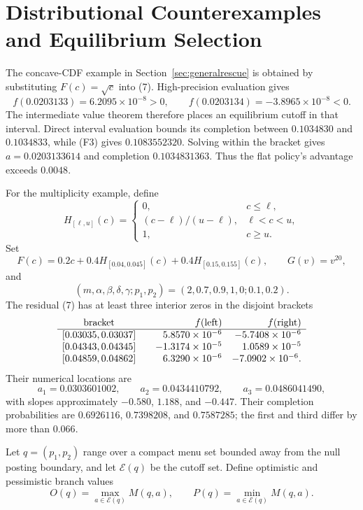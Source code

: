 \documentclass[mnsc,blindrev]{informs3}
\newcommand{\calE}{\mathcal E}
\begin{document}
\section{Distributional Counterexamples and Equilibrium Selection}
\label{app:general}

The concave-CDF example in Section~\ref{sec:generalrescue} is obtained by
substituting \(F(c)=\sqrt c\) into (7).  High-precision evaluation gives
\[
 f(0.0203133)=6.2095\times10^{-8}>0,\qquad
 f(0.0203134)=-3.8965\times10^{-8}<0.
\]
The intermediate value theorem therefore places an equilibrium cutoff in
that interval.  Direct interval evaluation bounds its completion between
\(0.1034830\) and \(0.1034833\), while (F3) gives \(0.1083552320\).  Solving
within the bracket gives \(a=0.0203133614\) and completion
\(0.1034831363\).  Thus the flat policy's advantage exceeds \(0.0048\).

For the multiplicity example, define
\[
 H_{[\ell,u]}(c)=
 \begin{cases}
 0,&c\le\ell,\\
 (c-\ell)/(u-\ell),&\ell<c<u,\\
 1,&c\ge u.
 \end{cases}
\]
Set
\[
 F(c)=0.2c+0.4H_{[0.04,0.045]}(c)
      +0.4H_{[0.15,0.155]}(c),\qquad G(v)=v^{20},
\]
and
\[
 (m,\alpha,\beta,\delta,\gamma;p_1,p_2)
 =(2,0.7,0.9,1,0;0.1,0.2).
\]
The residual (7) has at least three interior zeros in the disjoint brackets
\[
\begin{array}{c@{\qquad}r@{\quad}r}
\text{bracket}&f(\text{left})&f(\text{right})\\
\hline
{[0.03035,0.03037]}& 5.8570\times10^{-6}&-5.7408\times10^{-6}\\
{[0.04343,0.04345]}&-1.3174\times10^{-5}& 1.0589\times10^{-5}\\
{[0.04859,0.04862]}& 6.3290\times10^{-6}&-7.0902\times10^{-6}.
\end{array}
\]
Their numerical locations are
\[
 a_1=0.0303601002,\qquad
 a_2=0.0434410792,\qquad
 a_3=0.0486041490,
\]
with slopes approximately \(-0.580\), \(1.188\), and \(-0.447\).
Their completion probabilities are \(0.6926116\), \(0.7398208\), and
\(0.7587285\); the first and third differ by more than \(0.066\).

Let $q=(p_1,p_2)$ range over a compact menu set bounded away from the null
posting boundary, and let $\calE(q)$ be the cutoff set.  Define optimistic and
pessimistic branch values
\[
 O(q)=\max_{a\in\calE(q)}M(q,a),\qquad
 P(q)=\min_{a\in\calE(q)}M(q,a).
\]
\end{document}
